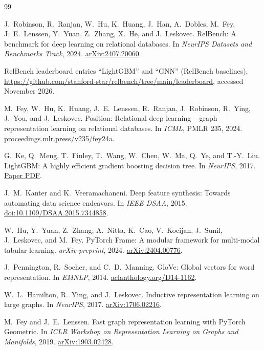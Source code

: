 \documentclass{article}
\begin{document}
\small
\begin{thebibliography}{99}

 J.~Robinson, R.~Ranjan, W.~Hu, K.~Huang, J.~Han, A.~Dobles, M.~Fey, J.~E.~Lenssen, Y.~Yuan, Z.~Zhang, X.~He, and J.~Leskovec. RelBench: A benchmark for deep learning on relational databases. In \emph{NeurIPS Datasets and Benchmarks Track}, 2024. \href{https://arxiv.org/abs/2407.20060}{arXiv:2407.20060}.

 RelBench leaderboard entries ``LightGBM'' and ``GNN'' (RelBench baselines), \url{https://github.com/stanford-star/relbench/tree/main/leaderboard}, accessed November 2026.

 M.~Fey, W.~Hu, K.~Huang, J.~E.~Lenssen, R.~Ranjan, J.~Robinson, R.~Ying, J.~You, and J.~Leskovec. Position: Relational deep learning -- graph representation learning on relational databases. In \emph{ICML}, PMLR 235, 2024. \href{https://proceedings.mlr.press/v235/fey24a.html}{proceedings.mlr.press/v235/fey24a}.

 G.~Ke, Q.~Meng, T.~Finley, T.~Wang, W.~Chen, W.~Ma, Q.~Ye, and T.-Y.~Liu. LightGBM: A highly efficient gradient boosting decision tree. In \emph{NeurIPS}, 2017. \href{https://proceedings.neurips.cc/paper/2017/file/6449f44a102fde848669bdd9eb6b76fa-Paper.pdf}{Paper PDF}.

 J.~M.~Kanter and K.~Veeramachaneni. Deep feature synthesis: Towards automating data science endeavors. In \emph{IEEE DSAA}, 2015. \href{https://doi.org/10.1109/DSAA.2015.7344858}{doi:10.1109/DSAA.2015.7344858}.

 W.~Hu, Y.~Yuan, Z.~Zhang, A.~Nitta, K.~Cao, V.~Kocijan, J.~Sunil, J.~Leskovec, and M.~Fey. PyTorch Frame: A modular framework for multi-modal tabular learning. \emph{arXiv preprint}, 2024. \href{https://arxiv.org/abs/2404.00776}{arXiv:2404.00776}.

 J.~Pennington, R.~Socher, and C.~D.~Manning. GloVe: Global vectors for word representation. In \emph{EMNLP}, 2014. \href{https://aclanthology.org/D14-1162}{aclanthology.org/D14-1162}.

 W.~L.~Hamilton, R.~Ying, and J.~Leskovec. Inductive representation learning on large graphs. In \emph{NeurIPS}, 2017. \href{https://arxiv.org/abs/1706.02216}{arXiv:1706.02216}.

 M.~Fey and J.~E.~Lenssen. Fast graph representation learning with PyTorch Geometric. In \emph{ICLR Workshop on Representation Learning on Graphs and Manifolds}, 2019. \href{https://arxiv.org/abs/1903.02428}{arXiv:1903.02428}.


\end{thebibliography}
\end{document}
